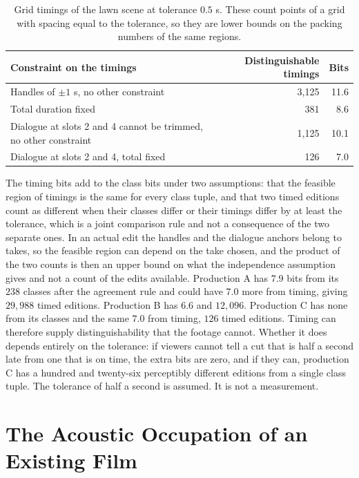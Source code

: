 \documentclass[11pt,twoside,openright]{book}
\theoremstyle{plain}
\theoremstyle{definition}
\theoremstyle{remark}
\begin{document}
\begin{table}[ht]
\centering
\begin{tabular}{@{}p{8cm}rr@{}}
\toprule
Constraint on the timings & Distinguishable timings & Bits\\
\midrule
Handles of $\pm1$ s, no other constraint & 3,125 & 11.6\\
Total duration fixed & 381 & 8.6\\
Dialogue at slots 2 and 4 cannot be trimmed, no other constraint & 1,125 & 10.1\\
Dialogue at slots 2 and 4, total fixed & 126 & 7.0\\
\bottomrule
\end{tabular}
\caption{Grid timings of the lawn scene at tolerance $0.5$ s. These count points of a grid with spacing equal to the tolerance, so they are lower bounds on the packing numbers of the same regions.}\label{tab:timing}
\end{table}

The timing bits add to the class bits under two assumptions: that the feasible region of timings is the same for every class tuple, and that two timed editions count as different when their classes differ or their timings differ by at least the tolerance, which is a joint comparison rule and not a consequence of the two separate ones. In an actual edit the handles and the dialogue anchors belong to takes, so the feasible region can depend on the take chosen, and the product of the two counts is then an upper bound on what the independence assumption gives and not a count of the edits available. Production A has $7.9$ bits from its $238$ classes after the agreement rule and could have $7.0$ more from timing, giving $29{,}988$ timed editions. Production B has $6.6$ and $12{,}096$. Production C has none from its classes and the same $7.0$ from timing, $126$ timed editions. Timing can therefore supply distinguishability that the footage cannot. Whether it does depends entirely on the tolerance: if viewers cannot tell a cut that is half a second late from one that is on time, the extra bits are zero, and if they can, production C has a hundred and twenty-six perceptibly different editions from a single class tuple. The tolerance of half a second is assumed. It is not a measurement.

\section{The Acoustic Occupation of an Existing Film}\label{sec:occupation}
\end{document}
